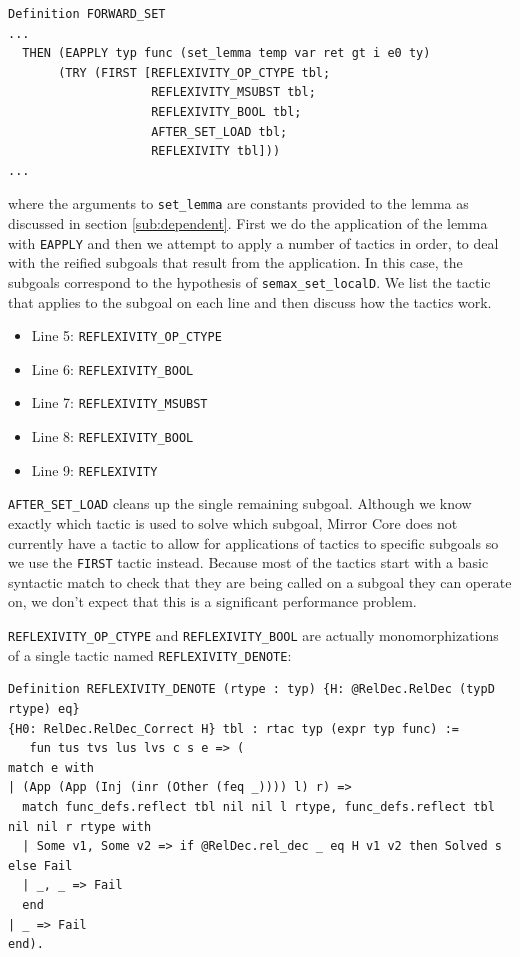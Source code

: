 \documentclass{puthesis}
\begin{document}
\begin{lstlisting}
Definition FORWARD_SET 
...
  THEN (EAPPLY typ func (set_lemma temp var ret gt i e0 ty)
       (TRY (FIRST [REFLEXIVITY_OP_CTYPE tbl;
                    REFLEXIVITY_MSUBST tbl; 
                    REFLEXIVITY_BOOL tbl;
                    AFTER_SET_LOAD tbl;
                    REFLEXIVITY tbl]))
...
\end{lstlisting}

where the arguments to \lstinline|set_lemma| are constants provided to
the lemma as discussed in section \ref{sub:dependent}.  First we do
the application of the lemma with \lstinline|EAPPLY| and then we
attempt to apply a number of tactics in order, to deal with the
reified subgoals that result from the application. In this case, the
subgoals correspond to the hypothesis of
\lstinline|semax_set_localD|. We list the tactic that applies to the
subgoal on each line and then discuss how the tactics work.

\begin{itemize}
\item Line 5: \lstinline|REFLEXIVITY_OP_CTYPE|
\item Line 6: \lstinline|REFLEXIVITY_BOOL|
\item Line 7: \lstinline|REFLEXIVITY_MSUBST|
\item Line 8: \lstinline|REFLEXIVITY_BOOL|
\item Line 9: \lstinline|REFLEXIVITY|
\end{itemize}

\lstinline|AFTER_SET_LOAD| cleans up the single remaining subgoal.
Although we know exactly which tactic is used to solve which subgoal,
Mirror Core does not currently have a tactic to allow for applications
of tactics to specific subgoals so we use the \lstinline|FIRST| tactic
instead. Because most of the tactics start with a basic syntactic
match to check that they are being called on a subgoal they can
operate on, we don't expect that this is a significant performance
problem.

\lstinline|REFLEXIVITY_OP_CTYPE| and \lstinline|REFLEXIVITY_BOOL| are
actually monomorphizations of a single tactic named
\lstinline|REFLEXIVITY_DENOTE|:

\begin{lstlisting}
Definition REFLEXIVITY_DENOTE (rtype : typ) {H: @RelDec.RelDec (typD rtype) eq}
{H0: RelDec.RelDec_Correct H} tbl : rtac typ (expr typ func) := 
   fun tus tvs lus lvs c s e => (
match e with
| (App (App (Inj (inr (Other (feq _)))) l) r) =>
  match func_defs.reflect tbl nil nil l rtype, func_defs.reflect tbl nil nil r rtype with
  | Some v1, Some v2 => if @RelDec.rel_dec _ eq H v1 v2 then Solved s else Fail
  | _, _ => Fail
  end
| _ => Fail
end).
\end{lstlisting}
\end{document}
